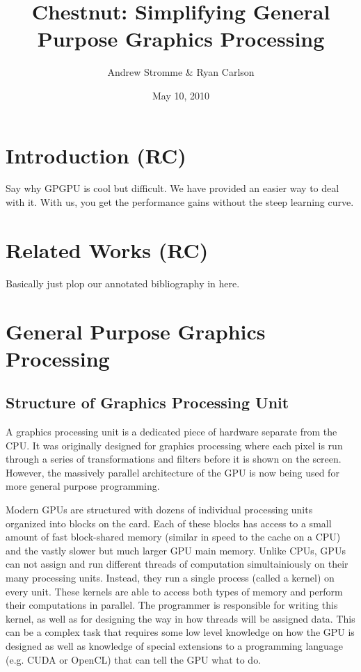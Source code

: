 \documentclass{article}
\renewcommand{\|}{\origbar} %
\begin{document}
\title{Chestnut: Simplifying General Purpose Graphics Processing}
\author{Andrew Stromme \& Ryan Carlson}
\date{May 10, 2010}
\maketitle

\begin{abstract}
\end{abstract}

\section{Introduction (RC)}

Say why GPGPU is cool but difficult. We have provided an easier way to deal with it. With us, you get the performance gains without the steep learning curve.

\section{Related Works (RC)}

Basically just plop our annotated bibliography in here.

\section{General Purpose Graphics Processing}

\subsection{Structure of Graphics Processing Unit}

A graphics processing unit is a dedicated piece of hardware separate from the CPU. It was originally designed for graphics processing where each pixel is run through a series of transformations and filters before it is shown on the screen. However, the massively parallel architecture of the GPU is now being used for more general purpose programming. 

Modern GPUs are structured with dozens of individual processing units organized into blocks on the card. Each of these blocks has access to a small amount of fast block-shared memory (similar in speed to the cache on a CPU) and the vastly slower but much larger GPU main memory. Unlike CPUs, GPUs can not assign and run different threads of computation simultainiously on their many processing units. Instead, they run a single process (called a kernel) on every unit. These kernels are able to access both types of memory and perform their computations in parallel. The programmer is responsible for writing this kernel, as well as for designing the way in how threads will be assigned data. This can be a complex task that requires some low level knowledge on how the GPU is designed as well as knowledge of special extensions to a programming language (e.g. CUDA or OpenCL) that can tell the GPU what to do.
\end{document}
